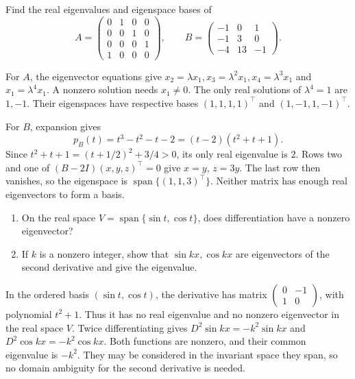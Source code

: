 \begin{problem}\label{ex:08:lang-cyclic}
Find the real eigenvalues and eigenspace bases of
\[
 A=\begin{pmatrix}0&1&0&0\\0&0&1&0\\0&0&0&1\\1&0&0&0\end{pmatrix},
 \qquad B=\begin{pmatrix}-1&0&1\\-1&3&0\\-4&13&-1\end{pmatrix}.
\]
\end{problem}
\begin{solution}
For \(A\), the eigenvector equations give
\(x_2=\lambda x_1,x_3=\lambda^2x_1,x_4=\lambda^3x_1\) and
\(x_1=\lambda^4x_1\). A nonzero solution needs \(x_1\ne0\).
The only real solutions of \(\lambda^4=1\) are \(1,-1\).
Their eigenspaces have respective bases
\((1,1,1,1)^\top\) and \((1,-1,1,-1)^\top\).

For \(B\), expansion gives
\[
 p_B(t)=t^3-t^2-t-2=(t-2)(t^2+t+1).
\]
Since \(t^2+t+1=(t+1/2)^2+3/4>0\), its only real eigenvalue is \(2\).
Rows two and one of \((B-2I)(x,y,z)^\top=0\) give \(x=y\), \(z=3y\).
The last row then vanishes, so the eigenspace is
\(\operatorname{span}\{(1,1,3)^\top\}\).
Neither matrix has enough real eigenvectors to form a basis.
\end{solution}

\begin{problem}\label{ex:08:derivative}
\begin{enumerate}
\item On the real space \(V=\operatorname{span}\{\sin t,\cos t\}\),
does differentiation have a nonzero eigenvector?
\item If \(k\) is a nonzero integer, show that \(\sin kx,\cos kx\)
are eigenvectors of the second derivative and give the eigenvalue.
\end{enumerate}
\end{problem}
\begin{solution}
In the ordered basis \((\sin t,\cos t)\), the derivative has matrix
\(\begin{pmatrix}0&-1\\1&0\end{pmatrix}\), with polynomial \(t^2+1\).
Thus it has no real eigenvalue and no nonzero eigenvector in the real
space \(V\).
Twice differentiating gives
\(D^2\sin kx=-k^2\sin kx\) and \(D^2\cos kx=-k^2\cos kx\).
Both functions are nonzero, and their common eigenvalue is \(-k^2\).
They may be considered in the invariant space they span, so no domain
ambiguity for the second derivative is needed.
\end{solution}

